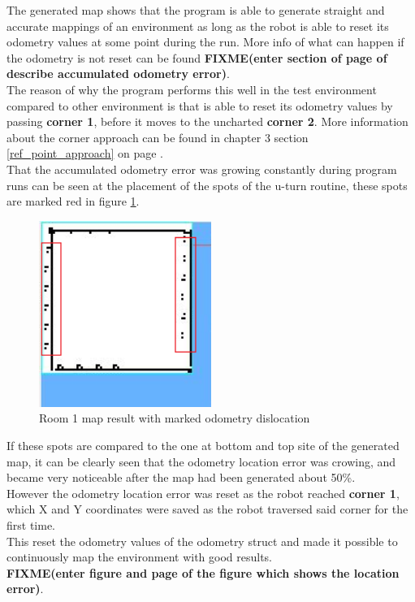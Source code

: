 The generated map shows that the program is able to generate straight and accurate mappings of an environment as long as the robot is able to reset its odometry values at some point during the run. More info of what can happen if the odometry is not reset can be found \textbf{FIXME(enter section of page of describe accumulated odometry error)}. \\
The reason of why the program performs this well in the test environment compared to other environment is that is able to reset its odometry values by passing \textbf{corner 1}, before it moves to the uncharted \textbf{corner 2}. More information about the corner approach can be found in chapter 3 section \ref{ref_point_approach} on page \pageref{ref_point_approach}. \\
That the accumulated odometry error was growing constantly during program runs can be seen at the placement of the spots of the u-turn routine, these spots are marked red in figure \ref{room1_empty_marked}.

\begin{figure}[h]
\centering
\includegraphics[width = 0.5\textwidth]{../../figures/room1_result_marked.png}
\caption{Room 1 map result with marked odometry dislocation}
\label{room1_empty_marked}
\end{figure}

If these spots are compared to the one at bottom and top site of the generated map, it can be clearly seen that the odometry location error was crowing, and became very noticeable after the map had been generated about 50\%.\\[3ex]

However the odometry location error was reset as the robot reached \textbf{corner 1}, which X and Y coordinates were saved as the robot traversed said corner for the first time. \\
This reset the odometry values of the odometry struct and made it possible to continuously map the environment with good results. \\
\textbf{FIXME(enter figure and page of the figure which shows  the location error)}.\\[3ex]

